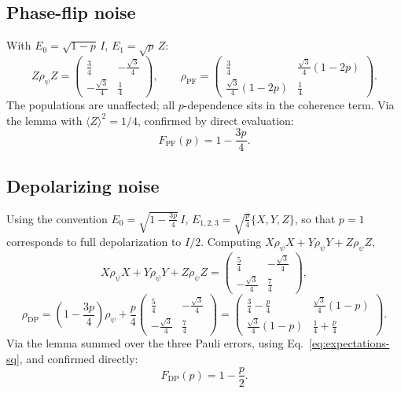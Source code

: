 \documentclass[11pt]{article}
\begin{document}
\subsection{Phase-flip noise}

With $E_0=\sqrt{1-p}\,I$, $E_1=\sqrt{p}\,Z$:
\begin{equation}
Z\rho_\psi Z = \begin{pmatrix}\tfrac34 & -\tfrac{\sqrt3}{4}\\ -\tfrac{\sqrt3}{4} & \tfrac14\end{pmatrix}, \qquad
\rho_{\text{PF}} = \begin{pmatrix}\tfrac34 & \tfrac{\sqrt3}{4}(1-2p)\\ \tfrac{\sqrt3}{4}(1-2p) & \tfrac14\end{pmatrix}.
\label{eq:pf-rho}
\end{equation}
The populations are unaffected; all $p$-dependence sits in the coherence term. Via the lemma with $\langle Z\rangle^2=1/4$, confirmed by direct evaluation:
\begin{equation}
F_{\text{PF}}(p) = 1-\frac{3p}{4}.
\label{eq:F-PF}
\end{equation}

\subsection{Depolarizing noise}

Using the convention $E_0=\sqrt{1-\tfrac{3p}{4}}\,I$, $E_{1,2,3}=\sqrt{\tfrac{p}{4}}\{X,Y,Z\}$, so that $p=1$ corresponds to full depolarization to $I/2$. Computing $X\rho_\psi X+Y\rho_\psi Y+Z\rho_\psi Z$,
\begin{equation}
X\rho_\psi X+Y\rho_\psi Y+Z\rho_\psi Z = \begin{pmatrix}\tfrac54 & -\tfrac{\sqrt3}{4}\\ -\tfrac{\sqrt3}{4} & \tfrac74\end{pmatrix},
\label{eq:dp-sum}
\end{equation}
\begin{equation}
\rho_{\text{DP}} = \left(1-\frac{3p}{4}\right)\rho_\psi + \frac{p}{4}\begin{pmatrix}\tfrac54 & -\tfrac{\sqrt3}{4}\\ -\tfrac{\sqrt3}{4} & \tfrac74\end{pmatrix} = \begin{pmatrix}\tfrac34-\tfrac{p}{4} & \tfrac{\sqrt3}{4}(1-p)\\ \tfrac{\sqrt3}{4}(1-p) & \tfrac14+\tfrac{p}{4}\end{pmatrix}.
\label{eq:dp-rho}
\end{equation}
Via the lemma summed over the three Pauli errors, using Eq.~\eqref{eq:expectations-sq}, and confirmed directly:
\begin{equation}
F_{\text{DP}}(p) = 1-\frac{p}{2}.
\label{eq:F-DP}
\end{equation}
\end{document}
